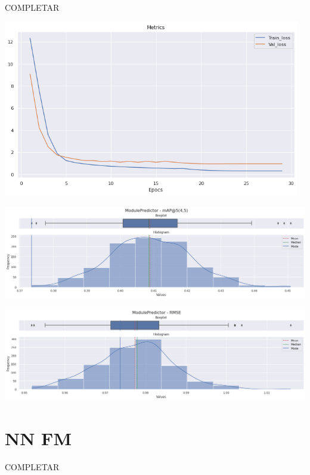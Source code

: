 \documentclass[11pt,a4paper,twoside]{thesis}
\begin{document}
COMPLETAR

\begin{center}
	\includegraphics[width=13cm]{./images/metrics-BGFM-train-val-loss.png}
\end{center}

\begin{center}
\includegraphics[width=15cm]{./images/metrics-BGFM-mapk.png}
\end{center}

\begin{center}
\includegraphics[width=15cm]{./images/metrics-BGFM-RMSE.png}
\end{center}


\section{NN FM}

COMPLETAR
\end{document}
